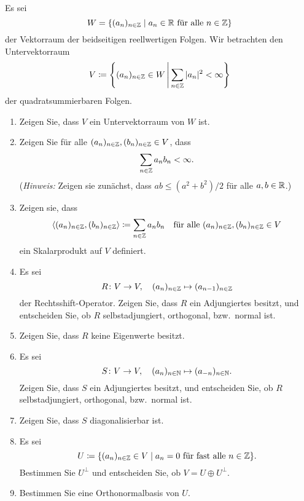 \documentclass[a4paper,10pt]{scrartcl}
\begin{document}
\begin{question}
  Es sei
  \[
    W = \{(a_n)_{n \in \mathbb{Z}} \mid \text{$a_n \in \mathbb{R}$ für alle $n \in \mathbb{Z}$}\}
  \]
  der Vektorraum der beidseitigen reellwertigen Folgen.
  Wir betrachten den Untervektorraum
  \[
    V \coloneqq
    \left\{
      (a_n)_{n \in \mathbb{Z}} \in W
    \,\middle|\,
      \sum_{n \in \mathbb{Z}} |a_n|^2 < \infty
   \right\}
  \]
  der quadratsummierbaren Folgen.
  \begin{enumerate}[leftmargin=*]
    \item
      Zeigen Sie, dass $V$ ein Untervektorraum von $W$ ist.
    \item
      Zeigen Sie für alle $(a_n)_{n \in \mathbb{Z}}, (b_n)_{n \in \mathbb{Z}} \in V$, dass
      \[
        \sum_{n \in \mathbb{Z}} a_n b_n < \infty.
      \]
      (\emph{Hinweis:} Zeigen sie zunächst, dass $ab \leq (a^2 + b^2)/2$ für alle $a, b \in \mathbb{R}$.)
    \item
      Zeigen sie, dass
      \[
                  \langle  (a_n)_{n \in \mathbb{Z}}, (b_n)_{n \in \mathbb{Z}}  \rangle
        \coloneqq \sum_{n \in \mathbb{Z}} a_n b_n
        \quad
        \text{für alle $(a_n)_{n \in \mathbb{Z}}, (b_n)_{n \in \mathbb{Z}} \in V$}
      \]
      ein Skalarprodukt auf $V$ definiert.
    \item
      Es sei
      \[
        R \colon V \to V,
        \quad
        (a_n)_{n \in \mathbb{Z}} \mapsto (a_{n-1})_{n \in \mathbb{Z}}
      \]
      der Rechtsshift-Operator.
      Zeigen Sie, dass $R$ ein Adjungiertes besitzt, und entscheiden Sie, ob $R$ selbstadjungiert, orthogonal, bzw.\ normal ist.
    \item
      Zeigen Sie, dass $R$ keine Eigenwerte besitzt.
    \item
      Es sei
      \[
        S \colon V \to V,
        \quad
        (a_n)_{n \in \mathbb{N}} \mapsto (a_{-n})_{n \in \mathbb{N}}.
      \]
      Zeigen Sie, dass $S$ ein Adjungiertes besitzt, und entscheiden Sie, ob $R$ selbstadjungiert, orthogonal, bzw.\ normal ist.
    \item
      Zeigen Sie, dass $S$ diagonalisierbar ist.
    \item
      Es sei
      \[
        U \coloneqq \{(a_n)_{n \in \mathbb{Z}} \in V \mid \text{$a_n = 0$ für fast alle $n \in \mathbb{Z}$}\}.
      \]
      Bestimmen Sie $U^\perp$ und entscheiden Sie, ob $V = U \oplus U^\perp$.
    \item
      Bestimmen Sie eine Orthonormalbasis von $U$.
  \end{enumerate}
\end{question}
\end{document}
